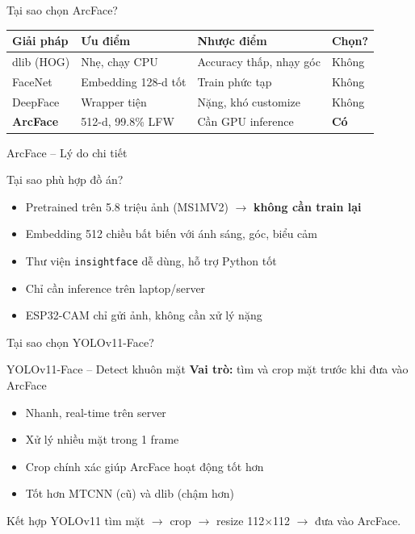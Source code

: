 \documentclass[aspectratio=169]{beamer}
\begin{document}
\begin{frame}{Tại sao chọn ArcFace?}
  \renewcommand{\arraystretch}{1.3}
  \begin{tabular}{p{2.2cm}p{4.5cm}p{4.5cm}p{1.3cm}}
    \toprule
    \textbf{Giải pháp} & \textbf{Ưu điểm} & \textbf{Nhược điểm} & \textbf{Chọn?} \\
    \midrule
    dlib (HOG) & Nhẹ, chạy CPU & Accuracy thấp, nhạy góc & Không \\
    FaceNet & Embedding 128-d tốt & Train phức tạp & Không \\
    DeepFace & Wrapper tiện & Nặng, khó customize & Không \\
    \textbf{ArcFace} & 512-d, 99.8\% LFW & Cần GPU inference & \textbf{Có} \\
    \bottomrule
  \end{tabular}
\end{frame}

\begin{frame}{ArcFace -- Lý do chi tiết}
  \begin{block}{Tại sao phù hợp đồ án?}
    \begin{itemize}
      \item Pretrained trên 5.8 triệu ảnh (MS1MV2) $\to$ \textbf{không cần train lại}
      \item Embedding 512 chiều bất biến với ánh sáng, góc, biểu cảm
      \item Thư viện \texttt{insightface} dễ dùng, hỗ trợ Python tốt
      \item Chỉ cần inference trên laptop/server
      \item ESP32-CAM chỉ gửi ảnh, không cần xử lý nặng
    \end{itemize}
  \end{block}
\end{frame}

\begin{frame}{Tại sao chọn YOLOv11-Face?}
  \begin{block}{YOLOv11-Face -- Detect khuôn mặt}
    \textbf{Vai trò:} tìm và crop mặt trước khi đưa vào ArcFace
  \end{block}

  \vspace{0.5em}
  \begin{itemize}
    \item Nhanh, real-time trên server
    \item Xử lý nhiều mặt trong 1 frame
    \item Crop chính xác giúp ArcFace hoạt động tốt hơn
    \item Tốt hơn MTCNN (cũ) và dlib (chậm hơn)
  \end{itemize}

  \vspace{0.5em}
  \begin{alertblock}{Kết hợp}
    YOLOv11 tìm mặt $\to$ crop $\to$ resize 112$\times$112 $\to$ đưa vào ArcFace.
  \end{alertblock}
\end{frame}
\end{document}
